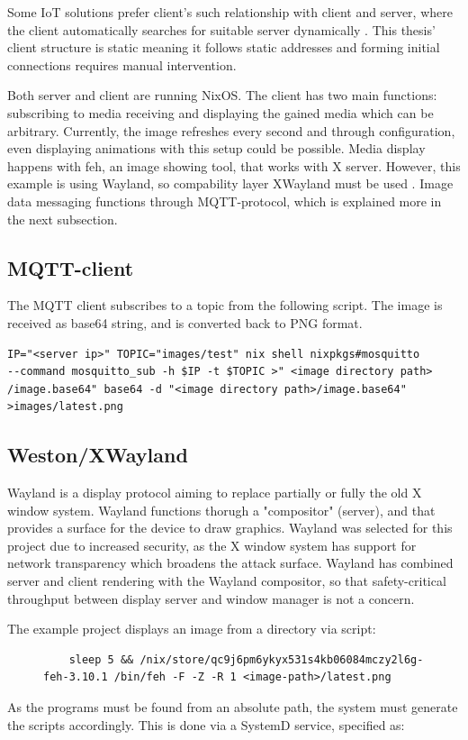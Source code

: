 Some IoT solutions prefer client's such relationship with client and
server, where the client automatically searches for suitable server
dynamically \cite{kandoi2021operating}. This thesis' client structure
is static meaning it follows static addresses and forming initial
connections requires manual intervention.

Both server and client are running NixOS. The client has two main
functions: subscribing to media receiving and displaying the gained
media which can be arbitrary. Currently, the image refreshes every
second and through configuration, even displaying animations with this
setup could be possible. Media display happens with feh, an image
showing tool, that works with X server. However, this example is using
Wayland, so compability layer XWayland must be used
\cite{waylandWayland}. Image data messaging functions through
MQTT-protocol, which is explained more in the next subsection.

\subsection{MQTT-client}
The MQTT client subscribes to a topic from the following script. The
image is received as base64 string, and is converted back to PNG
format.
\begin{lstlisting}
IP="<server ip>" TOPIC="images/test" nix shell nixpkgs#mosquitto
--command mosquitto_sub -h $IP -t $TOPIC >" <image directory path>
/image.base64" base64 -d "<image directory path>/image.base64"
>images/latest.png
\end{lstlisting}
\subsection{Weston/XWayland}
Wayland is a display protocol aiming to replace partially or fully the
old X window system. Wayland functions thorugh a "compositor"
(server), and that provides a surface for the device to draw
graphics. Wayland was selected for this project due to increased
security, as the X window system has support for network transparency
which broadens the attack surface. Wayland has combined server and
client rendering with the Wayland compositor, so that safety-critical
throughput between display server and window manager is not a
concern. \cite{waylandWayland} %

The example project displays an image from a directory via script:
\begin{figure}[H]
\begin{lstlisting} 
    sleep 5 && /nix/store/qc9j6pm6ykyx531s4kb06084mczy2l6g-feh-3.10.1 /bin/feh -F -Z -R 1 <image-path>/latest.png
\end{lstlisting}
\label{fehscript}
\end{figure}
As the programs must be found from an absolute path, the system must
generate the scripts accordingly. This is done via a SystemD service,
specified as:

